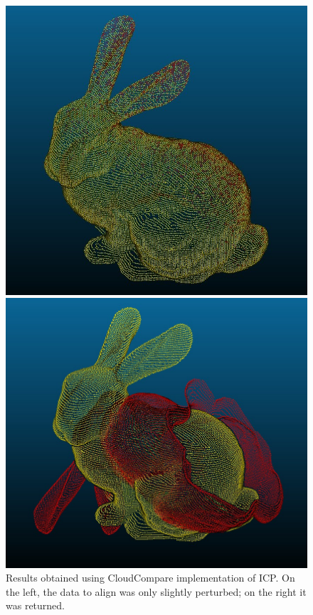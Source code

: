 \documentclass[french]{article}
\begin{document}
\begin{figure}[h]
	\centering
	\begin{minipage}{0.45\linewidth}
		\centering
		\includegraphics[width=\linewidth]{q1-perturbed.jpg}
	\end{minipage}\hfill
	\begin{minipage}{0.45\linewidth}
		\centering
		\includegraphics[width=\linewidth]{q1-returned.jpg}
	\end{minipage}
	\caption{Results obtained using CloudCompare implementation of ICP. On the left, the data to align was only slightly perturbed; on the right it was returned.}
	\label{fig:q1-bunny}
\end{figure}
\end{document}
